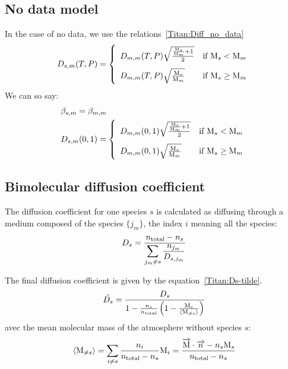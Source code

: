 \subsection{No data model}

In the case of no data, we use the relations~\ref{Titan:Diff_no_data}
\begin{equation}
\renewcommand{\arraystretch}{2}
\diff_{s,m}(T,P) =
\left\{\begin{array}{l@{\quad}r}
\diff_{m,m}(T,P)\sqrt{\frac{\frac{\Mm_s}{\Mm_m} + 1}{2}} & \text{if }\Mm_s < \Mm_m    \\
\diff_{m,m}(T,P)\sqrt{\frac{\Mm_s}{\Mm_m}}               & \text{if }\Mm_s \geq \Mm_m \\
\end{array}\right.
\label{Titan:Diff_no_data}
\end{equation}
We can so say:
\begin{equation}
\begin{split}
\renewcommand{\arraystretch}{2}
&\smas{s,m} = \smas{m,m} \\ 
&\Amas{s,m} =
\left\{\begin{array}{l@{\quad}r}
\Amas{m,m}\sqrt{\frac{\frac{\Mm_s}{\Mm_m} + 1}{2}} & \text{if }\Mm_s < \Mm_m    \\
\Amas{m,m}\sqrt{\frac{\Mm_s}{\Mm_m}}                    & \text{if }\Mm_s \geq \Mm_m \\
\end{array}\right.
\end{split}
\label{Titan:Diff_no_data_to_Massman}
\end{equation}

\subsection{Bimolecular diffusion coefficient}

The diffusion coefficient for one species $s$ is calculated as diffusing through
a medium composed of the species $\{j_m\}$, the index $i$ meaning all the
species:
\begin{equation}
D_s = \frac{n_\text{total} - n_s}{\displaystyle\sum_{j_m \neq s}\frac{n_{j_m}}{D_{s,j_m}}}
\label{Titan:Ds}
\end{equation}

The final diffusion coefficient is given by the equation~\ref{Titan:Ds-tilde}.
\begin{equation}
\tilde{D_s} = \frac{D_s}{1-\frac{n_s}{n_\text{total}}\left(1 - \frac{\text{M}_s}{\langle\text{M}_{\neq s}\rangle}\right)}
\label{Titan:Ds-tilde}
\end{equation}
avec  the mean molecular mass of the atmosphere without
species $s$:
\begin{equation}
\langle\text{M}_{\neq s}\rangle   = \sum_{i\neq s} \frac{n_i}{n_\text{total} - n_s}\text{M}_i
                      = \frac{\overrightarrow{\text{M}}\cdot\overrightarrow{n} - n_s\text{M}_s}{n_\text{total} - n_s}
\end{equation}

